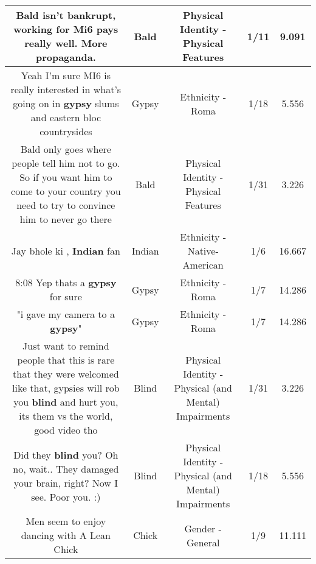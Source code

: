 \documentclass[11pt]{article}
\newlength\mylength
\begin{document}
\begin{center}
\begin{longtable}{|C{.65\mylength}|C{.30\mylength}|C{.12\mylength}|C{.12\mylength}|C{.12\mylength}|}
  \small Bald isn't bankrupt, working for Mi6 pays really well. More propaganda.\normalsize   & Bald & Physical Identity - Physical Features & 1/11 & 9.091 \\  \hline
  \small Yeah I'm sure MI6 is really interested in what's going on in \textbf{gypsy} slums and eastern bloc countrysides\normalsize   & Gypsy & Ethnicity - Roma & 1/18 & 5.556 \\  \hline
  \small Bald only goes where people tell him not to go. So if you want him to come to your country you need to try to convince him to never go there\normalsize   & Bald & Physical Identity - Physical Features & 1/31 & 3.226 \\  \hline
  \small Jay bhole ki , \textbf{Indian} fan\normalsize   & Indian & Ethnicity - Native-American & 1/6 & 16.667 \\  \hline
  \small 8:08 Yep thats a \textbf{gypsy} for sure\normalsize   & Gypsy & Ethnicity - Roma & 1/7 & 14.286 \\  \hline
  \small "i gave my camera to a \textbf{gypsy}"\normalsize   & Gypsy & Ethnicity - Roma & 1/7 & 14.286 \\  \hline
  \small Just want to remind people that this is rare that they were welcomed like that, gypsies will rob you \textbf{blind} and hurt you, its them vs the world, good video tho\normalsize   & Blind & Physical Identity - Physical (and Mental) Impairments & 1/31 & 3.226 \\  \hline
  \small Did they \textbf{blind} you? Oh no, wait.. They damaged your brain, right? Now I see. Poor you. :)\normalsize   & Blind & Physical Identity - Physical (and Mental) Impairments & 1/18 & 5.556 \\  \hline
  \small Men seem to enjoy dancing with A Lean Chick\normalsize   & Chick & Gender - General & 1/9 & 11.111 \\  \hline

\end{longtable}
\end{center}
\end{document}
